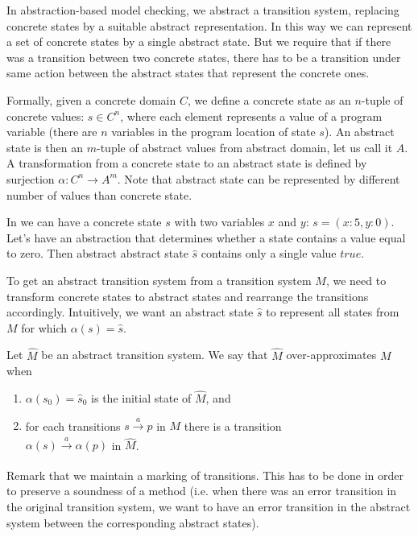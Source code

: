 In abstraction-based model checking, we abstract a transition system, replacing
concrete states by a suitable abstract representation. In this way we can
represent a set of concrete states by a single abstract state. But we require
that if there was a transition between two concrete states, there has to be a
transition under same action between the abstract states that represent the
concrete ones.

Formally, given a concrete domain $C$, we define a concrete state as an $n$-tuple of concrete values:
$s \in C^n$, where each element represents a value of a program variable (there
are $n$ variables in the program location of state $s$). An abstract state is
then an $m$-tuple of abstract values from abstract domain, let us call it $A$. A
transformation from a concrete state to an abstract state is defined by
surjection $\alpha \colon C^n \rightarrow A^m$.  Note that abstract state can be
represented by different number of values than concrete state.
\begin{example}
In \LLVM we can have a concrete state $s$ with two variables $x$
and $y$: $s = (x:5,y:0)$. Let's have an abstraction that determines whether a state
contains a value equal to zero. Then abstract abstract state $\widehat{s}$ contains only
a single value $true$.
\end{example}

To get an abstract transition system from a transition system $M$, we need to
transform concrete states to abstract states and rearrange the transitions
accordingly. Intuitively, we want an abstract state $\widehat{s}$ to represent
all states from $M$ for which $\alpha(s) = \widehat{s}$.

\begin{definition}\label{def:am}
    Let $\widehat{M}$ be an abstract transition system. We say that $\widehat{M}$
    over-approximates $M$ when
    \begin{enumerate}
        \item $\alpha(s_0) = \widehat{s}_0$ is the initial state of $\widehat{M}$, and
        \item for each transitions $s \xrightarrow[]{a} p$ in $M$  there is a
            transition\\$\alpha(s) \xrightarrow[]{a} \alpha(p)$ in $\widehat{M}$.
    \end{enumerate}
\end{definition}
Remark that we maintain a marking of transitions. This has to be done in order
to preserve a soundness of a method (i.e. when there was an error transition in
the original transition system, we want to have an error transition in the
abstract system between the corresponding abstract states).

